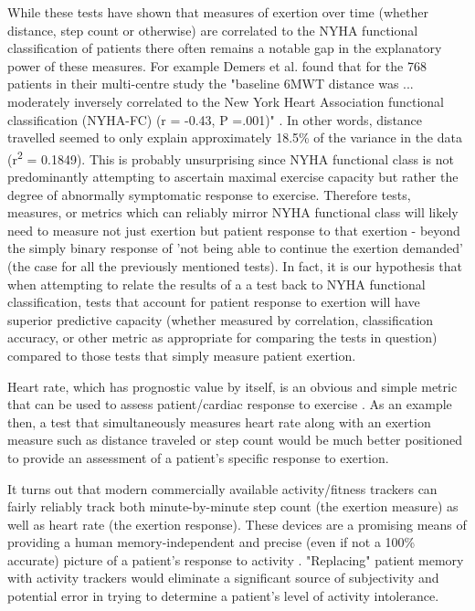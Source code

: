 \documentclass[]{article}
\begin{document}
While these tests have shown that measures of exertion over time (whether distance, step count or otherwise) are correlated to the NYHA functional classification of patients there often remains a notable gap in the explanatory power of these measures. For example Demers et al. found that for the 768 patients in their multi-centre study the "baseline 6MWT distance was ... moderately inversely correlated to the New York Heart Association functional classification (NYHA-FC) (r = -0.43, P =.001)" \cite{Demers2001}. In other words, distance travelled seemed to only explain approximately 18.5\% of the variance in the data (r\textsuperscript{2} = 0.1849). This is probably unsurprising since NYHA functional class is not predominantly attempting to ascertain maximal exercise capacity but rather the degree of abnormally symptomatic response to exercise. Therefore tests, measures, or metrics which can reliably mirror NYHA functional class will likely need to measure not just exertion but patient response to that exertion - beyond the simply binary response of 'not being able to continue the exertion demanded' (the case for all the previously mentioned tests). In fact, it is our hypothesis that when attempting to relate the results of a a test back to NYHA functional classification, tests that account for patient response to exertion will have superior predictive capacity (whether measured by correlation, classification accuracy, or other metric as appropriate for comparing the tests in question) compared to those tests that simply measure patient exertion.

Heart rate, which has prognostic value by itself, is an obvious and simple metric that can be used to assess patient/cardiac response to exercise \cite{Moon1996,Imai1994,Borer2010,Uth2004,Arzeno2007}. As an example then, a test that simultaneously measures heart rate along with an exertion measure such as distance traveled or step count would be much better positioned to provide an assessment of a patient's specific response to exertion. 

It turns out that modern commercially available activity/fitness trackers can fairly reliably track both minute-by-minute step count (the exertion measure) as well as heart rate (the exertion response). These devices are a promising means of providing a human memory-independent and precise (even if not a 100\% accurate) picture of a patient's response to activity \cite{Wang2016,Kooiman2015,Ferguson2015,Attal2015,Butte2012,Evenson2015,An2017,El-Amrawy2015,Wen2017}. "Replacing" patient memory with activity trackers would eliminate a significant source of subjectivity and potential error in trying to determine a patient's level of activity intolerance.
\end{document}
